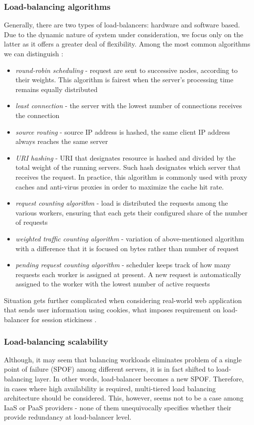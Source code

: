 \subsubsection{Load-balancing algorithms}
Generally, there are two types of load-balancers: hardware and software based. Due to the dynamic nature of system under consideration, we focus only on the latter as it offers a greater deal of flexibility. Among the most common algorithms we can distinguish \cite{HaProxyDoc}:
\begin{itemize}
 \item \textit{round-robin scheduling} - request are sent to successive nodes, according to their weights. This algorithm is fairest when the server's processing time remains equally distributed \cite{HaProxyDoc}
 \item \textit{least connection} - the server with the lowest number of connections receives the connection
 \item \textit{source routing} - source IP address is hashed, the same client IP address always reaches the same server
 \item \textit{URI hashing} - URI that designates resource is hashed and divided by the total weight of the running servers. Such hash designates which server that receives the request. In practice, this algorithm is commonly used with proxy caches and anti-virus proxies in order to maximize the cache hit rate.
 \item \textit{request counting algorithm} - load is distributed the requests among the various workers, ensuring that each gets their configured share of the number of requests
 \item \textit{weighted traffic counting algorithm} - variation of above-mentioned algorithm with a difference that it is focused on bytes rather than number of request
 \item \textit{pending request counting algorithm} - scheduler keeps track of how many requests each worker is assigned at present. A new request is automatically assigned to the worker with the lowest number of active requests
\end{itemize}

Situation gets further complicated when considering real-world web application that sends user information using cookies, what imposes requirement on load-balancer for session stickiness \cite{StBaMa11}. 

\subsubsection{Load-balancing scalability}
Although, it may seem that balancing workloads eliminates problem of a single point of failure (SPOF) among different servers, it is in fact shifted to load-balancing layer. In other words, load-balancer becomes a new SPOF. Therefore, in cases where high availability is required, multi-tiered load balancing architecture should be considered. This, however, seems not to be a case among IaaS or PaaS providers - none of them unequivocally specifies whether their provide redundancy at load-balancer level.

